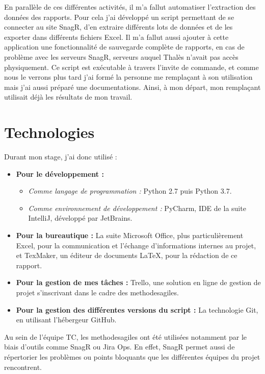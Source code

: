 En parallèle de ces différentes activités, il m'a fallut automatiser l'extraction des données des rapports. Pour cela j'ai développé un script permettant de se connecter au site \gls{SnagR}, d'en extraire différents lots de données et de les exporter dans différents fichiers Excel. Il m'a fallut aussi ajouter à cette application une fonctionnalité de sauvegarde complète de rapports, en cas de problème avec les serveurs SnagR, serveurs auquel Thalès n'avait pas accès physiquement. 
Ce script est exécutable à travers l'invite de commande, et comme nous le verrons plus tard j'ai formé la personne me remplaçant à son utilisation mais j'ai aussi préparé une documentations. Ainsi, à mon départ, mon remplaçant utilisait déjà les résultats de mon travail.

\section{Technologies}
Durant mon stage, j'ai donc utilisé : 
\begin{itemize}
\item \textbf{Pour le développement :}
\begin{itemize}
\item \textit{Comme langage de programmation :} Python 2.7 puis Python 3.7.
\item \textit{Comme environnement de développement :} PyCharm, \gls{IDE} de la suite IntelliJ, développé par JetBrains.
\end{itemize}
\item \textbf{Pour la bureautique :} La suite Microsoft Office, plus particulièrement Excel, pour la communication et l'échange d'informations internes au projet, et TexMaker, un éditeur de documents \gls{LaTeX}, pour la rédaction de ce rapport.
\item \textbf{Pour la gestion de mes tâches :} Trello, une solution en ligne de gestion de projet s'inscrivant dans le cadre des \gls{methodesagiles}.
\item \textbf{Pour la gestion des différentes versions du script :} La technologie \gls{Git}, en utilisant l'hébergeur GitHub.
\end{itemize}

Au sein de l'équipe \gls{TC}, les \gls{methodesagiles} ont été utilisées notamment par le biais d'outils comme \gls{SnagR} ou Jira Ops. En effet, \gls{SnagR} permet aussi de répertorier les problèmes ou points bloquants que les différentes équipes du projet rencontrent. 

